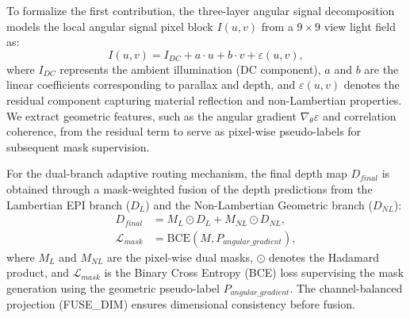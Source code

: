\documentclass[lettersize,journal]{IEEEtran}
\begin{document}
To formalize the first contribution, the three-layer angular signal decomposition models the local angular signal pixel block $I(u,v)$ from a $9 \times 9$ view light field as:
\begin{equation}
I(u,v) = I_{DC} + a \cdot u + b \cdot v + \varepsilon(u,v),
\label{eq:ch1_2}
\end{equation}
where $I_{DC}$ represents the ambient illumination (DC component), $a$ and $b$ are the linear coefficients corresponding to parallax and depth, and $\varepsilon(u,v)$ denotes the residual component capturing material reflection and non-Lambertian properties. We extract geometric features, such as the angular gradient $\nabla_{\theta} \varepsilon$ and correlation coherence, from the residual term to serve as pixel-wise pseudo-labels for subsequent mask supervision.

For the dual-branch adaptive routing mechanism, the final depth map $D_{final}$ is obtained through a mask-weighted fusion of the depth predictions from the Lambertian EPI branch ($D_L$) and the Non-Lambertian Geometric branch ($D_{NL}$):
\begin{align}
D_{final} &= M_L \odot D_L + M_{NL} \odot D_{NL}, \label{eq:ch1_3} \\
\mathcal{L}_{mask} &= \text{BCE}(M, P_{angular\_gradient}), \label{eq:ch1_4}
\end{align}
where $M_L$ and $M_{NL}$ are the pixel-wise dual masks, $\odot$ denotes the Hadamard product, and $\mathcal{L}_{mask}$ is the Binary Cross Entropy (BCE) loss supervising the mask generation using the geometric pseudo-label $P_{angular\_gradient}$. The channel-balanced projection (FUSE\_DIM) ensures dimensional consistency before fusion.

\begin{table}[!t]
\centering
\caption{Summary of Core Contributions and Corresponding Architectural Modules}
\label{tab:contributions_summary}
\end{table}
\end{document}
